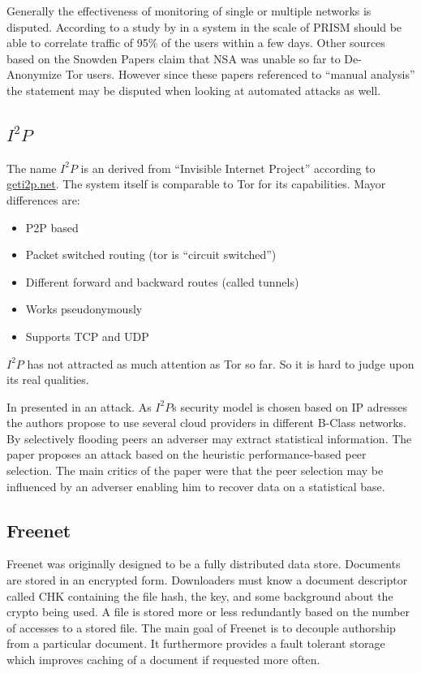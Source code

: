Generally the effectiveness of monitoring of single or multiple networks is disputed. According to a study by \citeauthor{ccs2013-usersrouted} in \citeyear{ccs2013-usersrouted}\cite{ccs2013-usersrouted} a system in the scale of PRISM should be able to correlate traffic of 95\% of the users within a few days. Other sources based on the Snowden Papers claim that NSA was unable so far to De-Anonymize Tor users. However since these papers referenced to ``manual analysis'' the  statement may be disputed when looking at automated attacks as well.


\subsection{$I^2P$}
The name $I^2P$ is an derived from  ``Invisible Internet Project'' according to \href{https://geti2p.net/}{geti2p.net}. The system itself is comparable to Tor for its capabilities. Mayor differences are:
\begin{itemize}
	\item P2P based
	\item Packet switched routing (tor is ``circuit switched'')
	\item Different forward and backward routes (called tunnels)
	\item Works pseudonymously
	\item Supports TCP and UDP
\end{itemize}

$I^2P$ has not attracted as much attention as Tor so far. So it is hard to judge upon its real qualities.

In \citeyear{pets2011-i2p} \citeauthor{pets2011-i2p} presented in \cite{pets2011-i2p} an attack. As $I^2P$s security model is chosen based on IP adresses the authors propose to use several cloud providers in different B-Class networks. By selectively flooding peers an adverser may extract statistical information. The paper proposes an attack based on the heuristic performance-based peer selection. The main critics of the paper were that the peer selection may be influenced by an adverser enabling him to recover data on a statistical base.

\subsection{Freenet}
Freenet was originally designed to be a fully distributed data store\cite{freenet}. Documents are stored in an encrypted form. Downloaders must know a document descriptor called CHK containing the file hash, the key, and some background about the crypto being used. A file is stored more or less redundantly based on the number of accesses to a stored file. The main goal of Freenet is to decouple  authorship from a particular document. It furthermore provides a fault tolerant storage which improves caching of a document if requested more often.

